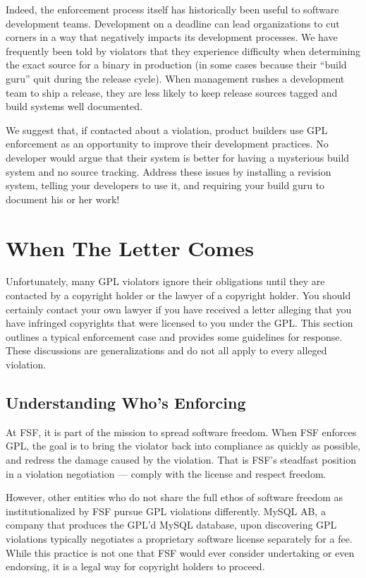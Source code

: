 Indeed, the enforcement process itself has historically been useful to
software development teams.  Development on a deadline can lead
organizations to cut corners in a way that negatively impacts its
development processes.  We have frequently been told by violators that
they experience difficulty when determining the exact source for a binary
in production (in some cases because their ``build guru'' quit during the
release cycle).  When management rushes a development team to ship a
release, they are less likely to keep release sources tagged and build
systems well documented.

We suggest that, if contacted about a violation, product builders use GPL
enforcement as an opportunity to improve their development practices.  No
developer would argue that their system is better for having a mysterious
build system and no source tracking.  Address these issues by installing a
revision system, telling your developers to use it, and requiring your
build guru to document his or her work!

\chapter{When The Letter Comes}

Unfortunately, many GPL violators ignore their obligations until they are
contacted by a copyright holder or the lawyer of a copyright holder.  You
should certainly contact your own lawyer if you have received a letter
alleging that you have infringed copyrights that were licensed to you
under the GPL\@.  This section outlines a typical enforcement case and
provides some guidelines for response.  These discussions are
generalizations and do not all apply to every alleged violation.

\section{Understanding Who's Enforcing}
\label{compliance-understanding-whos-enforcing}

At FSF, it is part of the mission to spread software freedom. When FSF
enforces GPL, the goal is to bring the violator back into compliance as
quickly as possible, and redress the damage caused by the violation.
That is FSF's steadfast position in a violation negotiation --- comply
with the license and respect freedom.

However, other entities who do not share the full ethos of software
freedom as institutionalized by FSF pursue GPL violations differently.
MySQL AB, a company that produces the GPL'd MySQL database, upon
discovering GPL violations typically negotiates a proprietary software
license separately for a fee. While this practice is not one that FSF
would ever consider undertaking or even endorsing, it is a legal way for
copyright holders to proceed.



